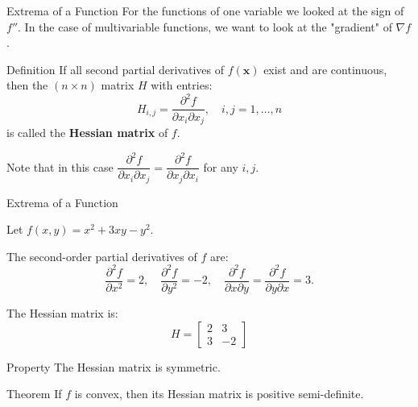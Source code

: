 \documentclass{beamer}
\newcommand{\vx}{\mathbf{x}}
\begin{document}
\begin{frame}{Extrema of a Function}
For the functions of one variable we looked at the sign of $f''$. In the case of multivariable functions, we want to look at the "gradient" of $\nabla f$.\pause
\begin{block}{Definition}
    If all second partial derivatives of \( f(\vx) \) exist and are continuous, then the $(n\times n)$ matrix $H$ with entries:
\[
H_{i,j} = \frac{\partial^2 f}{\partial x_i \partial x_j}, \quad i, j = 1, \ldots, n
\]
is called the \textbf{Hessian matrix} of \( f \).
\end{block}
\pause Note that in this case $ \dfrac{\partial^2 f}{\partial x_i \partial x_j}= \dfrac{\partial^2 f}{\partial x_j \partial x_i}$ for any $i,j$.

\end{frame}


\begin{frame}{Extrema of a Function}

\begin{example}
    
    Let \( f(x, y) = x^2 + 3xy -y^2 \). 

The second-order partial derivatives of \( f \) are:
\[
\frac{\partial^2 f}{\partial x^2} = 2, \quad
\frac{\partial^2 f}{\partial y^2} = -2, \quad
\frac{\partial^2 f}{\partial x \partial y} = \frac{\partial^2 f}{\partial y \partial x} = 3.
\]

The Hessian matrix is:
\[
H = 
\begin{bmatrix}
2 & 3 \\
3 & -2
\end{bmatrix}
\]

\end{example}
\pause

\begin{block}{Property}
The Hessian matrix is symmetric.
\end{block}\pause
\begin{block}{Theorem}
   If \( f \) is convex, then its Hessian matrix is positive semi-definite.
\end{block}
\end{frame}
\end{document}

